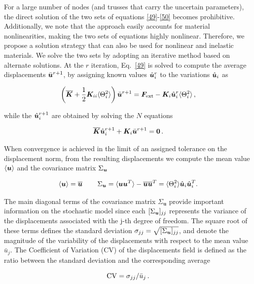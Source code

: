 \documentclass[preprint,12pt]{elsarticle}
\def    \obu {{\overline{\bu}}}
\def    \obK {{\overline{\bK}}}
\def    \hbu {{\hat{\bu}_i}}
\begin{document}
For a large number of nodes (and trusses that carry the uncertain parameters), the direct solution of the two sets of equations \eqref{49}-\eqref{50} becomes prohibitive. Additionally, we note that the approach easily accounts for material nonlinearities, making the two sets of equations highly nonlinear. Therefore, we propose a solution strategy that can also be used for nonlinear and inelastic materials. We solve the two sets by adopting an iterative method based on alternate solutions. At the $r$ iteration, Eq.~\eqref{49} is solved to compute the average displacements $\bar {{\boldsymbol{u}}}^{r+1}$, by assigning known values $\hat{{\boldsymbol{u}}}^r_i$ to the variations $\hbu$ as
\begin{linenomath}
\begin{equation}\label{49bis}
    \left(   \obK
    +
    \frac{1}{2} 
    \bK_{ii} \langle \Theta_i^2 \rangle \right)  
    \bar \bu^{r+1}
    =
    \bF_{\rm ext} 
    - 
    \bK_i \hat\bu^r_i
    \langle \Theta_i^2 \rangle \, ,
\end{equation}
\end{linenomath}
while the $\hat{{\boldsymbol{u}}}^{r+1}_i$ are obtained by solving the $N$ equations
\begin{linenomath}
\begin{equation}\label{50bis}
    \obK
    \hat\bu^{r+1}_i
    +
    \bK_i 
    \bar \bu^{r+1}
    = \b0 \, .
\end{equation}
\end{linenomath}

When convergence is achieved in the limit of an assigned tolerance on the displacement norm, from the resulting displacements we compute the mean value $\langle {\boldsymbol{u}} \rangle$ and the covariance matrix $\Sigma_{{\boldsymbol{u}}}$ 
\begin{linenomath}
\begin{equation}\label{51}
    \langle \bu \rangle = \obu \, \qquad \Sigma_{\bu}= \langle \bu \bu^T \rangle - \obu \obu^T= \langle \Theta_i^2\rangle \hbu \hbu^T.
\end{equation}
\end{linenomath}
The main diagonal terms of the covariance matrix $\Sigma_{\textbf{u}}$ provide important information on the stochastic model since each $[{\Sigma_{\boldsymbol{u}}}]_{jj}$ represents the variance of the displacements associated with the j-th degree of freedom. The square root of these terms defines the standard deviation $\sigma_{jj}=\sqrt{[{\Sigma_{\boldsymbol{u}}}]_{jj}}$, and denote the magnitude of the variability of the displacements with respect to the mean value $\bar u_j$. The Coefficient of Variation (CV) of the displacements field is defined as the ratio between the standard deviation and the corresponding average
\begin{linenomath}
$${\rm CV} = \sigma_{jj}/\bar u_j \, .$$
\end{linenomath} 
\end{document}
